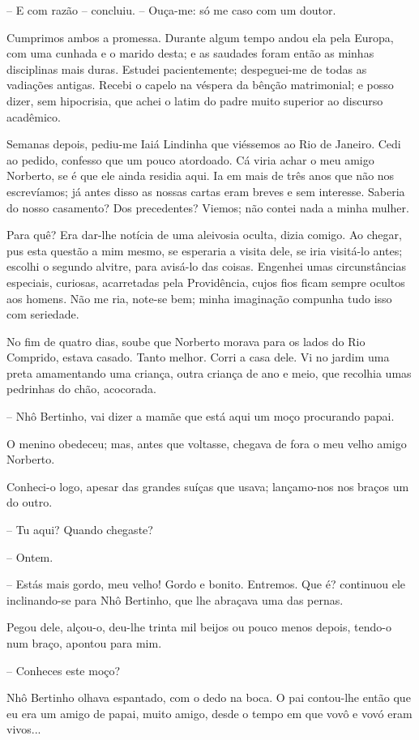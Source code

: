 -- E com razão -- concluiu. -- Ouça-me: só me caso com um doutor.

Cumprimos ambos a promessa. Durante algum tempo andou ela pela Europa,
com uma cunhada e o marido desta; e as saudades foram então as minhas
disciplinas mais duras. Estudei pacientemente; despeguei-me de todas as
vadiações antigas. Recebi o capelo na véspera da bênção matrimonial; e
posso dizer, sem hipocrisia, que achei o latim do padre muito superior
ao discurso acadêmico.

Semanas depois, pediu-me Iaiá Lindinha que viéssemos ao Rio de Janeiro.
Cedi ao pedido, confesso que um pouco atordoado. Cá viria achar o meu
amigo Norberto, se é que ele ainda residia aqui. Ia em mais de três anos
que não nos escrevíamos; já antes disso as nossas cartas eram breves e
sem interesse. Saberia do nosso casamento? Dos precedentes? Viemos; não
contei nada a minha mulher.

Para quê? Era dar-lhe notícia de uma aleivosia oculta, dizia comigo. Ao
chegar, pus esta questão a mim mesmo, se esperaria a visita dele, se
iria visitá-lo antes; escolhi o segundo alvitre, para avisá-lo das
coisas. Engenhei umas circunstâncias especiais, curiosas, acarretadas
pela Providência, cujos fios ficam sempre ocultos aos homens. Não me
ria, note-se bem; minha imaginação compunha tudo isso com seriedade.

No fim de quatro dias, soube que Norberto morava para os lados do Rio
Comprido, estava casado. Tanto melhor. Corri a casa dele. Vi no jardim
uma preta amamentando uma criança, outra criança de ano e meio, que
recolhia umas pedrinhas do chão, acocorada.

-- Nhô Bertinho, vai dizer a mamãe que está aqui um moço procurando
papai.

O menino obedeceu; mas, antes que voltasse, chegava de fora o meu velho
amigo Norberto.

Conheci-o logo, apesar das grandes suíças que usava; lançamo-nos nos
braços um do outro.

-- Tu aqui? Quando chegaste?

-- Ontem.

-- Estás mais gordo, meu velho! Gordo e bonito. Entremos. Que é?
continuou ele inclinando-se para Nhô Bertinho, que lhe abraçava uma das
pernas.

Pegou dele, alçou-o, deu-lhe trinta mil beijos ou pouco menos depois,
tendo-o num braço, apontou para mim.

-- Conheces este moço?

Nhô Bertinho olhava espantado, com o dedo na boca. O pai contou-lhe
então que eu era um amigo de papai, muito amigo, desde o tempo em que
vovô e vovó eram vivos...

